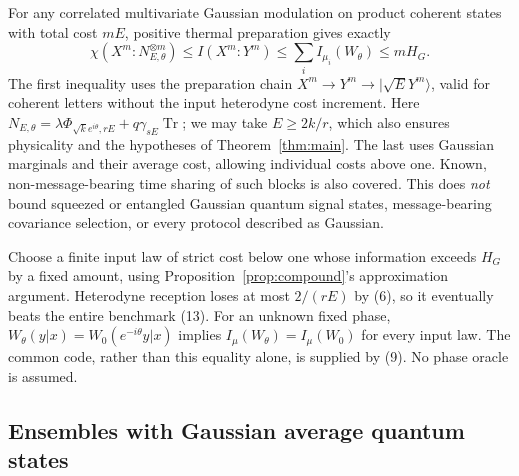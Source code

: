 \documentclass[11pt]{article}
\newcommand{\Tr}{\operatorname{Tr}}
\begin{document}
For any correlated multivariate Gaussian modulation on product coherent
states with total cost \(mE\), positive thermal preparation gives exactly
\[
 \chi(X^m:N_{E,\theta}^{\otimes m})
 \leq I(X^m:Y^m)\leq\sum_i I_{\mu_i}(W_\theta)\leq mH_G.     \tag{13}
\]
The first inequality uses the preparation chain
\(X^m\to Y^m\to|\sqrt E Y^m\rangle\), valid for coherent letters
without the input heterodyne cost increment.
Here \(N_{E,\theta}=\lambda\Phi_{\sqrt k e^{i\theta},rE}
+q\gamma_{sE}\Tr\); we may take \(E\geq2k/r\), which also
ensures physicality and the hypotheses of Theorem~\ref{thm:main}.
The last uses Gaussian marginals and their average cost, allowing
individual costs above one. Known, non-message-bearing time sharing of
such blocks is also covered. This does \emph{not} bound squeezed or
entangled Gaussian quantum signal states, message-bearing covariance
selection, or every protocol described as Gaussian.

Choose a finite input law of strict cost below one whose information
exceeds \(H_G\) by a fixed amount, using Proposition~\ref{prop:compound}'s
approximation argument. Heterodyne reception loses at most \(2/(rE)\)
by (6), so it eventually beats the entire benchmark (13).
For an unknown fixed phase,
\(W_\theta(y|x)=W_0(e^{-i\theta}y|x)\) implies
\(I_\mu(W_\theta)=I_\mu(W_0)\) for every input law.
The common code, rather than this equality alone, is supplied by (9).
No phase oracle is assumed.

\subsection{Ensembles with Gaussian average quantum states}
\end{document}
